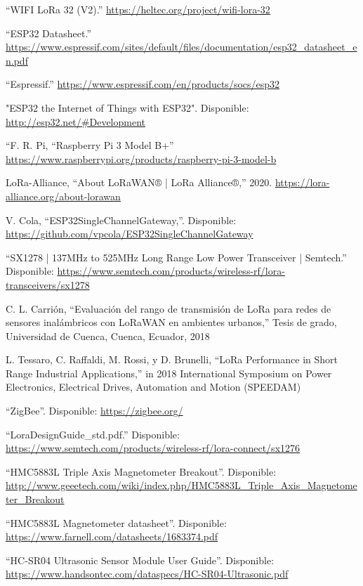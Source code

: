 \begin{references}
    “WIFI LoRa 32 (V2).” \url{https://heltec.org/project/wifi-lora-32}

    “ESP32 Datasheet.” \url{https://www.espressif.com/sites/default/files/documentation/esp32_datasheet_en.pdf}

    “Espressif.” \url{https://www.espressif.com/en/products/socs/esp32}

    "ESP32 the Internet of Things with ESP32". Disponible: \url{http://esp32.net/#Development}

    “F. R. Pi, “Raspberry Pi 3 Model B+” \url{https://www.raspberrypi.org/products/raspberry-pi-3-model-b}

    LoRa-Alliance, “About LoRaWAN® | LoRa Alliance®,” 2020. \url{https://lora-alliance.org/about-lorawan}

    V. Cola, “ESP32SingleChannelGateway,”. Disponible: \url{https://github.com/vpcola/ESP32SingleChannelGateway}

    “SX1278 | 137MHz to 525MHz Long Range Low Power Transceiver | Semtech.” Disponible: \url{https://www.semtech.com/products/wireless-rf/lora-transceivers/sx1278}

    C. L. Carrión, “Evaluación del rango de transmisión de LoRa para redes de sensores inalámbricos con LoRaWAN en ambientes urbanos,” Tesis de grado, Universidad de Cuenca, Cuenca, Ecuador, 2018

    L. Tessaro, C. Raffaldi, M. Rossi, y D. Brunelli, “LoRa Performance in Short Range Industrial Applications,” in 2018 International Symposium on Power Electronics, Electrical Drives, Automation and Motion (SPEEDAM)

    “ZigBee”. Disponible: \url{https://zigbee.org/}

    “LoraDesignGuide\_std.pdf.” Disponible: \url{https://www.semtech.com/products/wireless-rf/lora-connect/sx1276}

    “HMC5883L Triple Axis Magnetometer Breakout”. Disponible: \url{http://www.geeetech.com/wiki/index.php/HMC5883L_Triple_Axis_Magnetometer_Breakout}

    “HMC5883L Magnetometer datasheet”. Disponible: \url{https://www.farnell.com/datasheets/1683374.pdf}

    “HC-SR04 Ultrasonic Sensor Module User Guide”. Disponible: \url{https://www.handsontec.com/dataspecs/HC-SR04-Ultrasonic.pdf}


\end{references}
